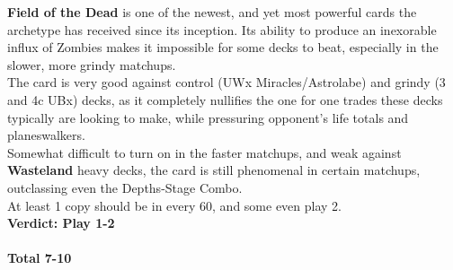 \documentclass{report}
\begin{document}
\textbf{Field of the Dead} is one of the newest, and yet most powerful cards the archetype has received since its inception. Its ability to produce an inexorable influx of Zombies makes it impossible for some decks to beat, especially in the slower, more grindy matchups.\\ The card is very good against control (UWx Miracles/Astrolabe) and grindy (3 and 4c UBx) decks, as it completely nullifies the one for one trades these decks typically are looking to make, while pressuring opponent's life totals and planeswalkers.\\ Somewhat difficult to turn on in the faster matchups, and weak against \textbf{Wasteland} heavy decks, the card is still phenomenal in certain matchups, outclassing even the Depths-Stage Combo.\\
At least 1 copy should be in every 60, and some even play 2.
\\\textbf{Verdict: Play 1-2\\\\}
\textbf{Total 7-10}\\
\end{document}
